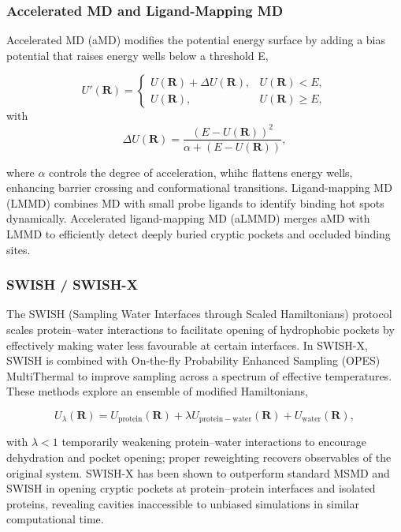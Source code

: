 \documentclass[12pt]{article}
\begin{document}
\subsubsection{Accelerated MD and Ligand-Mapping MD}

Accelerated MD (aMD) modifies the potential energy surface by adding a bias potential that raises energy wells below a threshold E,

\begin{equation}
U'(\mathbf{R}) =
\begin{cases}
U(\mathbf{R}) + \Delta U(\mathbf{R}), & U(\mathbf{R}) < E, \\
U(\mathbf{R}), & U(\mathbf{R}) \ge E,
\end{cases}
\end{equation}
with
\begin{equation}
\Delta U(\mathbf{R}) = \frac{(E - U(\mathbf{R}))^2}{\alpha + (E - U(\mathbf{R}))},
\end{equation}

where $\alpha$ controls the degree of acceleration, whihc flattens energy wells, enhancing barrier crossing and conformational transitions. Ligand-mapping MD (LMMD)\cite{CH5_Ng2022aLMMD} combines MD with small probe ligands to identify binding hot spots dynamically. Accelerated ligand-mapping MD (aLMMD)\cite{CH5_tze2022accelerated} merges aMD with LMMD to efficiently detect deeply buried cryptic pockets and occluded binding sites.

\subsubsection{SWISH / SWISH-X}

The SWISH (Sampling Water Interfaces through Scaled Hamiltonians)\cite{CH5_comitani2018exploring} protocol scales protein--water interactions to facilitate opening of hydrophobic pockets by effectively making water less favourable at certain interfaces. In SWISH-X\cite{CH5_Borsatto2024SWISHX}, SWISH is combined with On-the-fly Probability Enhanced Sampling (OPES) MultiThermal to improve sampling across a spectrum of effective temperatures. These methods explore an ensemble of modified Hamiltonians,

\begin{equation}
U_{\lambda}(\mathbf{R}) = U_{\mathrm{protein}}(\mathbf{R}) + \lambda U_{\mathrm{protein-water}}(\mathbf{R}) + U_{\mathrm{water}}(\mathbf{R}),
\end{equation}

with $\lambda < 1$ temporarily weakening protein--water interactions to encourage dehydration and pocket opening; proper reweighting recovers observables of the original system. SWISH-X\cite{CH5_Borsatto2024SWISHX} has been shown to outperform standard MSMD and SWISH\cite{CH5_comitani2018exploring} in opening cryptic pockets at protein--protein interfaces and isolated proteins, revealing cavities inaccessible to unbiased simulations in similar computational time.
\end{document}
